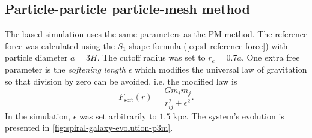 \subsection{Particle-particle particle-mesh method}
The \PThreeM{} based simulation uses the same parameters as the PM method.
The reference force was calculated using the $S_1$ shape formula (\autoref{eq:s1-reference-force}) with particle diameter $a=3H$.
The cutoff radius was set to $r_e=0.7a$.
One extra free parameter is the \textit{softening length} $\epsilon$ which modifies the universal law of gravitation so that division by zero can be avoided, i.e. the modified law is
\begin{equation*}
    F_\text{soft}(r) = \frac{G m_i m_j}{r_{ij}^2 + \epsilon^2}.
\end{equation*}
In the simulation, $\epsilon$ was set arbitrarily to $1.5$ kpc.
The system's evolution is presented in \autoref{fig:spiral-galaxy-evolution-p3m}.
